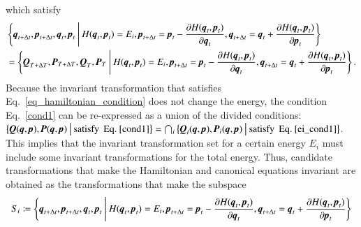\documentclass[preprint,
bibnotes,
 amsmath,amssymb,
 aps,
]{revtex4-1}
\begin{document}
which satisfy 
\begin{equation}
\begin{split}
&\left\{\textit{\textbf{q}}_{t+\Delta t},\textit{\textbf{p}}_{t+\Delta t},\textit{\textbf{q}}_t,\textit{\textbf{p}}_t\:\middle|\: H(\textit{\textbf{q}}_t,\textit{\textbf{p}}_t) = E_i,  {\textit{\textbf{p}}}_{t+\Delta t} = {\textit{\textbf{p}}}_t-\frac{\partial{H(\textit{\textbf{q}}_t,\textit{\textbf{p}}_t)}}{\partial{\textit{\textbf{q}}}_t}, \textit{\textbf{q}}_{t+\Delta t} = \textit{\textbf{q}}_t + \frac{\partial{H(\textit{\textbf{q}}_t,\textit{\textbf{p}}_t)}}{\partial{\textit{\textbf{p}}_t}}\right\}\\
 &= \left\{\textit{\textbf{Q}}_{T+\Delta T},\textit{\textbf{P}}_{T+\Delta T},\textit{\textbf{Q}}_{T},\textit{\textbf{P}}_{T}\:\middle|\: H(\textit{\textbf{q}}_t,\textit{\textbf{p}}_t) = E_i,  {\textit{\textbf{p}}}_{t+\Delta t} = {\textit{\textbf{p}}}_t-\frac{\partial{H(\textit{\textbf{q}}_t,\textit{\textbf{p}}_t)}}{\partial{\textit{\textbf{q}}}_t}, \textit{\textbf{q}}_{t+\Delta t} = \textit{\textbf{q}}_t + \frac{\partial{H(\textit{\textbf{q}}_t,\textit{\textbf{p}}_t)}}{\partial{\textit{\textbf{p}}_t}}\right\}.
 \label{ei_cond1}
\end{split}
\end{equation}
Because the invariant transformation that satisfies Eq.~\eqref{eq_hamiltonian_condition} does not change the energy, the condition Eq.~\eqref{cond1} can be re-expressed as a union of the divided conditions:  $\left\{\textit{\textbf{Q}}(\textit{\textbf{q}},\textit{\textbf{p}}),\textit{\textbf{P}}(\textit{\textbf{q}},\textit{\textbf{p}})\:\middle|\: {\rm satisfy}\:\:{\rm Eq.}\: \eqref{cond1}\right\}=\bigcap_{i}\left\{\textit{\textbf{Q}}_i(\textit{\textbf{q}},\textit{\textbf{p}}),\textit{\textbf{P}}_i(\textit{\textbf{q}},\textit{\textbf{p}})\:\middle|\: {\rm satisfy}\:\:{\rm Eq.}\: \eqref{ei_cond1}\right\}$. 
This implies that the invariant transformation set for a certain energy $E_i$ must include some invariant transformations for the total energy. 
Thus, candidate transformations that make the Hamiltonian and canonical equations invariant are obtained as the transformations that make the subspace
\begin{eqnarray}
S_i\coloneqq\left\{\textit{\textbf{q}}_{t+\Delta t},\textit{\textbf{p}}_{t+\Delta t},\textit{\textbf{q}}_t,\textit{\textbf{p}}_t\:\middle|\: H(\textit{\textbf{q}}_t,\textit{\textbf{p}}_t) = E_i,  {\textit{\textbf{p}}}_{t+\Delta t} = {\textit{\textbf{p}}}_t-\frac{\partial{H(\textit{\textbf{q}}_t,\textit{\textbf{p}}_t)}}{\partial{\textit{\textbf{q}}}_t}, \textit{\textbf{q}}_{t+\Delta t} = \textit{\textbf{q}}_t + \frac{\partial{H(\textit{\textbf{q}}_t,\textit{\textbf{p}}_t)}}{\partial{\textit{\textbf{p}}_t}}\right\}
\label{noether_manifold}
\end{eqnarray}
\end{document}
